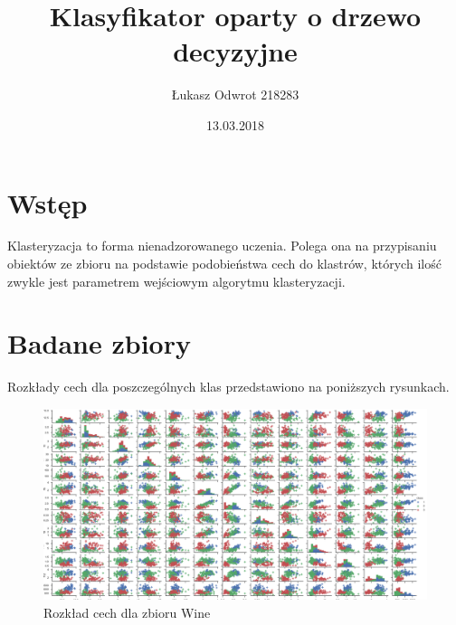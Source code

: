 \documentclass[12pt,a4paper]{article}
\title{Klasyfikator oparty o drzewo decyzyjne}
\date{13.03.2018}
\author{Łukasz Odwrot 218283}
\begin{document}
\maketitle
\thispagestyle{empty}
\newpage
\tableofcontents
\setcounter{page}{1}
\newpage

\section{Wstęp}
Klasteryzacja to forma nienadzorowanego uczenia. Polega ona na przypisaniu obiektów ze zbioru na podstawie podobieństwa cech do klastrów, których ilość zwykle jest parametrem wejściowym algorytmu klasteryzacji.
\section{Badane zbiory}

Rozkłady cech dla poszczególnych klas przedstawiono na poniższych rysunkach.

\begin{figure}[H]
\centering
\includegraphics[width=1\textwidth]{dsWineCombined.png}
\caption{Rozkład cech dla zbioru Wine}
\end{figure}
\end{document}
